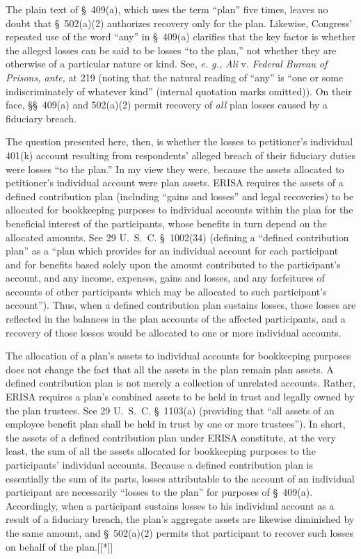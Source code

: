   The plain text of \S~409(a), which uses the term ``plan'' five times, leaves no doubt that \S~502(a)(2) authorizes recovery only for the plan. Likewise, Congress' repeated use of the word ``any'' in \S~409(a) clarifies that the key factor is whether the alleged losses can be said to be losses ``to the plan,'' not whether they are otherwise of a particular nature or kind. See, \emph{e. g., Ali} v. \emph{Federal Bureau of Prisons, ante,} at 219 (noting that the natural reading of ``any'' is ``one or some indiscriminately of whatever kind'' (internal quotation marks omitted)). On their face, \S\S~409(a) and 502(a)(2) permit recovery of \emph{all} plan losses caused by a fiduciary breach.\newpage 

  The question presented here, then, is whether the losses to petitioner's individual 401(k) account resulting from respondents' alleged breach of their fiduciary duties were losses ``to the plan.'' In my view they were, because the assets allocated to petitioner's individual account were plan assets. ERISA requires the assets of a defined contribution plan (including ``gains and losses'' and legal recoveries) to be allocated for bookkeeping purposes to individual accounts within the plan for the beneficial interest of the participants, whose benefits in turn depend on the allocated amounts. See 29 U.~S.~C. \S~1002(34) (defining a ``defined contribution plan'' as a ``plan which provides for an individual account for each participant and for benefits based solely upon the amount contributed to the participant's account, and any income, expenses, gains and losses, and any forfeitures of accounts of other participants which may be allocated to such participant's account''). Thus, when a defined contribution plan sustains losses, those losses are reflected in the balances in the plan accounts of the affected participants, and a recovery of those losses would be allocated to one or more individual accounts.

  The allocation of a plan's assets to individual accounts for bookkeeping purposes does not change the fact that all the assets in the plan remain plan assets. A defined contribution plan is not merely a collection of unrelated accounts. Rather, ERISA requires a plan's combined assets to be held in trust and legally owned by the plan trustees. See 29 U.~S.~C. \S~1103(a) (providing that ``all assets of an employee benefit plan shall be held in trust by one or more trustees''). In short, the assets of a defined contribution plan under ERISA constitute, at the very least, the sum of all the assets allocated for bookkeeping purposes to the participants' individual accounts. Because a defined contribution plan is essentially the sum of its parts, losses attributable to the account of an individual participant are necessarily ``losses to \newpage  the plan'' for purposes of \S~409(a). Accordingly, when a participant sustains losses to his individual account as a result of a fiduciary breach, the plan's aggregate assets are likewise diminished by the same amount, and \S~502(a)(2) permits that participant to recover such losses on behalf of the plan.[[*]]


